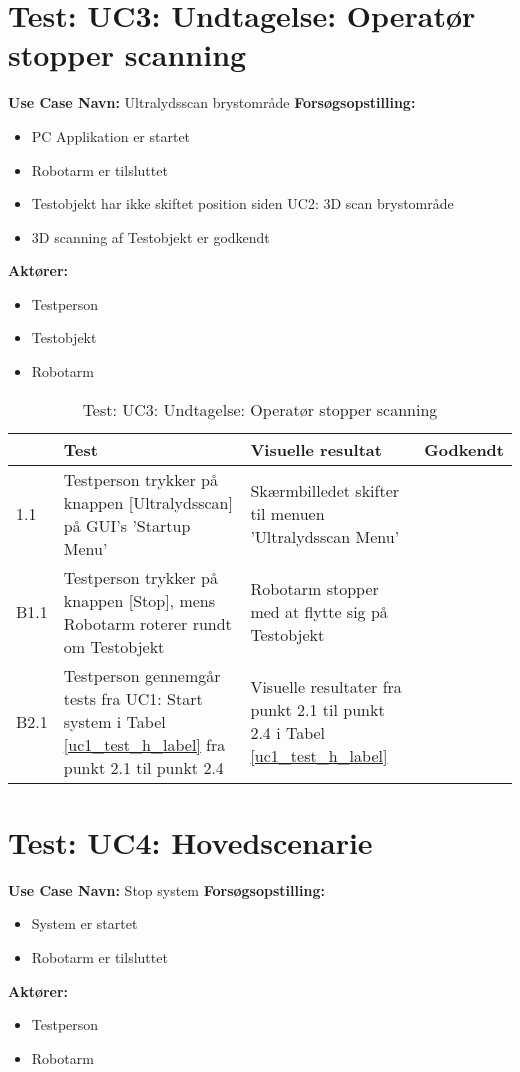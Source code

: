 
\section{Test: UC3: Undtagelse: Operatør stopper scanning}
\textbf{Use Case Navn:} Ultralydsscan brystområde \newline
\textbf{Forsøgsopstilling:}
\begin{itemize}
\item PC Applikation er startet
\item Robotarm er tilsluttet
\item Testobjekt har ikke skiftet position siden UC2: 3D scan brystområde
\item 3D scanning af Testobjekt er godkendt
\end{itemize}  
\textbf{Aktører:}
\begin{itemize}
\item Testperson
\item Testobjekt
\item Robotarm
\end{itemize}  

\begin{table}[htb]
\begin{tabularx}{\textwidth}{|p{0.7cm}|X|X|p{2cm}|}
\hline
\textbf{} & \textbf{Test} & \textbf{Visuelle resultat} &\textbf{Godkendt} \\ \hline
1.1 & Testperson trykker på knappen [Ultralydsscan] på GUI's 'Startup Menu' & Skærmbilledet skifter til menuen 'Ultralydsscan Menu' & \\ \hline
B1.1 & Testperson trykker på knappen [Stop], mens Robotarm roterer rundt om Testobjekt & Robotarm stopper med at flytte sig på Testobjekt &\\\hline
B2.1 &  Testperson gennemgår tests fra UC1: Start system i Tabel \ref{uc1_test_h_label} fra punkt 2.1 til punkt 2.4  & Visuelle resultater fra punkt 2.1 til punkt 2.4 i Tabel \ref{uc1_test_h_label} & \\\hline
\end{tabularx}
    \caption{Test: UC3: Undtagelse: Operatør stopper scanning} 
    \label{uc3_test_e_2_label}  
\end{table}
\newpage

\section{Test: UC4: Hovedscenarie}
\textbf{Use Case Navn:} Stop system \newline
\textbf{Forsøgsopstilling:}
\begin{itemize}
\item System er startet
\item Robotarm er tilsluttet
\end{itemize}  
\textbf{Aktører:}
\begin{itemize}
\item Testperson
\item Robotarm
\end{itemize}  


